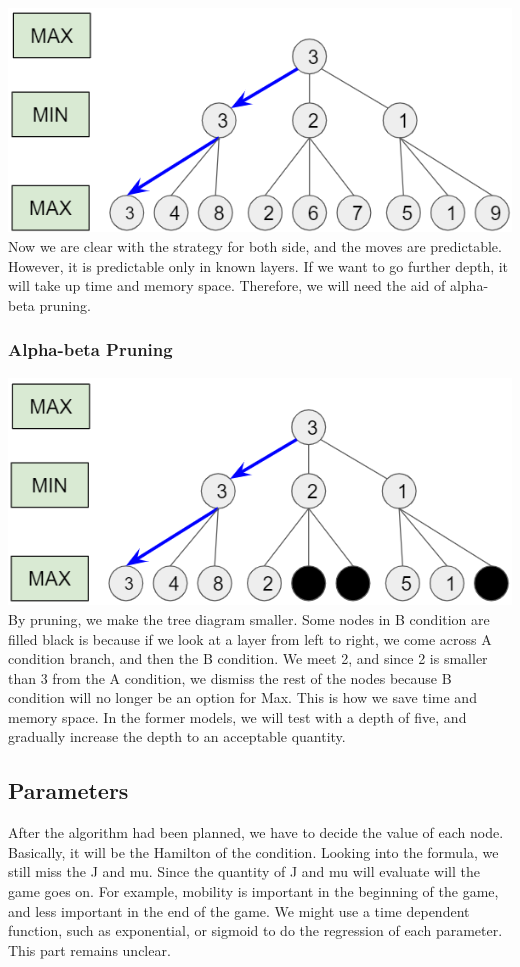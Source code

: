 \documentclass[aps,pra,reprint,amsmath,amssymb,floatfix]{revtex4-2}
\begin{document}
\includegraphics[scale=0.6]{3.png}\\
Now we are clear with the strategy for both side, and the moves are predictable. However, it is predictable only in known layers. If we want to go further depth, it will take up time and memory space. Therefore, we will need the aid of alpha-beta pruning.\\
\subsubsection{Alpha-beta Pruning}
\includegraphics[scale=0.6]{4.png}\\
By pruning, we make the tree diagram smaller. Some nodes in B condition are filled black is because if we look at a layer from left to right, we come across A condition branch, and then the B condition. We meet 2, and since 2 is smaller than 3 from the A condition, we dismiss the rest of the nodes because B condition will no longer be an option for Max. This is how we save time and memory space.
In the former models, we will test with a depth of five, and gradually increase the depth to an acceptable quantity. 

\subsection{Parameters}
After the algorithm had been planned, we have to decide the value of each node. Basically, it will be the Hamilton of the condition. Looking into the formula, we still miss the J and mu. Since the quantity of J and mu will evaluate will the game goes on. For example, mobility is important in the beginning of the game, and less important in the end of the game. We might use a time dependent function, such as exponential, or sigmoid to do the regression of each parameter. This part remains unclear.
\end{document}
